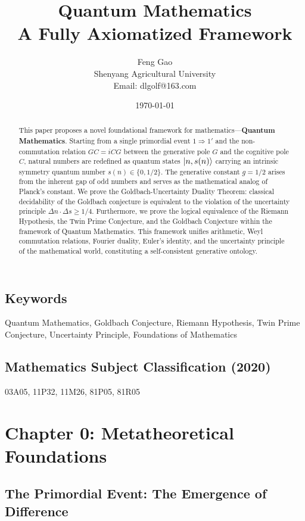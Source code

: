 \documentclass[12pt]{article}
\title{\Huge \textbf{Quantum Mathematics}\\[0.5cm]
\large A Fully Axiomatized Framework}
\author{Feng Gao\\
\small Shenyang Agricultural University\\
\small Email: dlgolf@163.com}
\date{\today}
\theoremstyle{definition}
\begin{document}
\maketitle

\begin{abstract}
This paper proposes a novel foundational framework for mathematics—\textbf{Quantum Mathematics}. Starting from a single primordial event \(1 \Rightarrow 1'\) and the non-commutation relation \(GC = iCG\) between the generative pole \(G\) and the cognitive pole \(C\), natural numbers are redefined as quantum states \(\ket{n, s(n)}\) carrying an intrinsic symmetry quantum number \(s(n) \in \{0, 1/2\}\). The generative constant \(g = 1/2\) arises from the inherent gap of odd numbers and serves as the mathematical analog of Planck's constant. We prove the Goldbach-Uncertainty Duality Theorem: classical decidability of the Goldbach conjecture is equivalent to the violation of the uncertainty principle \(\Delta n \cdot \Delta s \geq 1/4\). Furthermore, we prove the logical equivalence of the Riemann Hypothesis, the Twin Prime Conjecture, and the Goldbach Conjecture within the framework of Quantum Mathematics. This framework unifies arithmetic, Weyl commutation relations, Fourier duality, Euler's identity, and the uncertainty principle of the mathematical world, constituting a self-consistent generative ontology.
\end{abstract}

\subsection*{Keywords}
Quantum Mathematics, Goldbach Conjecture, Riemann Hypothesis, Twin Prime Conjecture, Uncertainty Principle, Foundations of Mathematics

\subsection*{Mathematics Subject Classification (2020)}
03A05, 11P32, 11M26, 81P05, 81R05

\tableofcontents

\newpage

\section*{Chapter 0: Metatheoretical Foundations}

\subsection{The Primordial Event: The Emergence of Difference}
\end{document}
